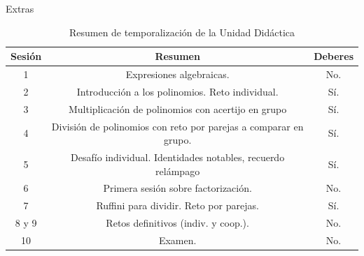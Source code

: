 \documentclass[10pt,notes,compress,usetitleprogressbar,aspectratio=1610]{beamer}
\begin{document}
\begin{frame}{Extras}
\begin{table}
\caption{Resumen de temporalización de la Unidad Didáctica}
\label{tbl:UD}
\begin{tabular}{|c|c|c|}
\hline
\textbf{Sesión} & \textbf{Resumen} & \textbf{Deberes}\\\hline
1 & Expresiones algebraicas. & No.\\\hline
2 & Introducción a los polinomios. Reto individual. & Sí.\\\hline
3 & Multiplicación de polinomios con acertijo en grupo & Sí. \\\hline
4 & División de polinomios con reto por parejas a comparar en grupo. & Sí.\\\hline
5 & Desafío individual. Identidades notables, recuerdo relámpago & Sí. \\\hline
6 & Primera sesión sobre factorización. & No.\\\hline
7 & Ruffini para dividir. Reto por parejas. & Sí.\\\hline
8 y 9 &  Retos definitivos (indiv. y coop.). & No. \\\hline
10 & Examen.  & No.\\\hline
\end{tabular}
\end{table}

\end{frame}
\end{document}
